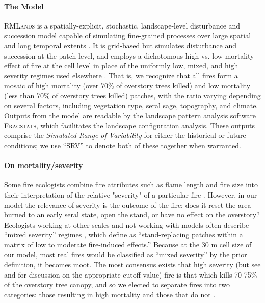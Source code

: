 \documentclass[12pt]{article}
\begin{document}
\begin{spacing}{1}
\paragraph{The Model}
\textsc{RMLands} is a spatially-explicit, stochastic, landscape-level disturbance and succession model capable of simulating fine-grained processes over large spatial and long temporal extents \citep{McGarigal2005}. It is grid-based but simulates disturbance and succession at the patch level, and employs a dichotomous high vs. low mortality effect of fire at the cell level in place of the uniformly low, mixed, and high severity regimes used elsewhere \citep{Mcgarigal2012}. That is, we recognize that all fires form a mosaic of high mortality (over 70\% of overstory trees killed) and low mortality (less than 70\% of overstory trees killed) patches, with the ratio varying depending on several factors, including vegetation type, seral sage, topography, and climate. Outputs from the model are readable by the landscape pattern analysis software \textsc{Fragstats}, which facilitates the landscape configuration analysis. These outputs comprise the \emph{Simulated Range of Variability} for either the historical or future conditions; we use ``SRV'' to denote both of these together when warranted.


\paragraph{On mortality/severity}
Some fire ecologists combine fire attributes such as flame length and fire size into their interpretation of the relative "severity" of a particular fire \citep{Agee1993}. However, in our model the relevance of severity is the outcome of the fire: does it reset the area burned to an early seral state, open the stand, or have no effect on the overstory?  Ecologists working at other scales and not working with models often describe ``mixed severity'' regimes \citep[e.g.,]{Kane2013}, which \citet{Collins2010} define as ``stand-replacing patches within a matrix of low to moderate fire-induced effects.'' Because at the 30 m cell size of our model, most real fires would be classified as ``mixed severity'' by the prior definition, it becomes moot. The most consensus exists that high severity (but see \citep{Fule2014} and \citep{Mallek2013} for discussion on the appropriate cutoff value) fire is that which kills 70-75\% of the overstory tree canopy, and so we elected to separate fires into two categories: those resulting in high mortality and those that do not \citep{Miller2009, Baker2014}.


\end{spacing}
\end{document}
